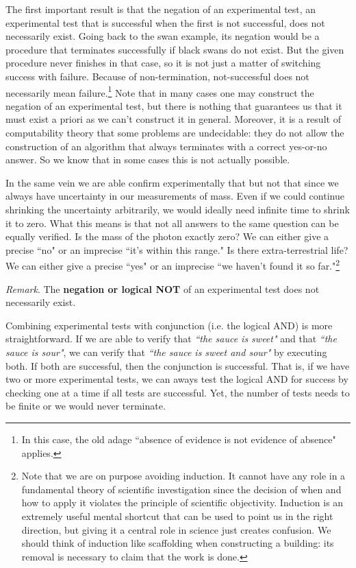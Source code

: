 \documentclass[11pt,letterpaper,fleqn]{memoir} %
\begin{document}
The first important result is that the negation of an experimental test, an experimental test that is successful when the first is not successful, does not necessarily exist. Going back to the swan example, its negation would be a procedure that terminates successfully if black swans do not exist. But the given procedure never finishes in that case, so it is not just a matter of switching success with failure. Because of non-termination, not-successful does not necessarily mean failure.\footnote{In this case, the old adage ``absence of evidence is not evidence of absence" applies.} Note that in many cases one may construct the negation of an experimental test, but there is nothing that guarantees us that it must exist a priori as we can't construct it in general. Moreover, it is a result of computability theory that some problems are undecidable: they do not allow the construction of an algorithm that always terminates with a correct yes-or-no answer. So we know that in some cases this is not actually possible.

In the same vein we are able confirm experimentally that  but not that  since we always have uncertainty in our measurements of mass. Even if we could continue shrinking the uncertainty arbitrarily, we would ideally need infinite time to shrink it to zero. What this means is that not all answers to the same question can be equally verified. Is the mass of the photon exactly zero? We can either give a precise ``no" or an imprecise ``it's within this range." Is there extra-terrestrial life? We can either give a precise ``yes" or an imprecise ``we haven't found it so far."\footnote{Note that we are on purpose avoiding induction. It cannot have any role in a fundamental theory of scientific investigation since the decision of when and how to apply it violates the principle of scientific objectivity. Induction is an extremely useful mental shortcut that can be used to point us in the right direction, but giving it a central role in science just creates confusion. We should think of induction like scaffolding when constructing a building: its removal is necessary to claim that the work is done.}


\begin{mathSection}
	\emph{Remark}. The \textbf{negation or logical NOT} of an experimental test does not necessarily exist.
\end{mathSection}

Combining experimental tests with conjunction (i.e. the logical AND) is more straightforward. If we are able to verify that \emph{``the sauce is sweet"} and that \emph{``the sauce is sour"}, we can verify that \emph{``the sauce is sweet and sour"} by executing both. If both are successful, then the conjunction is successful. That is, if we have two or more experimental tests, we can aways test the logical AND for success by checking one at a time if all tests are successful. Yet, the number of tests needs to be finite or we would never terminate.
\end{document}
